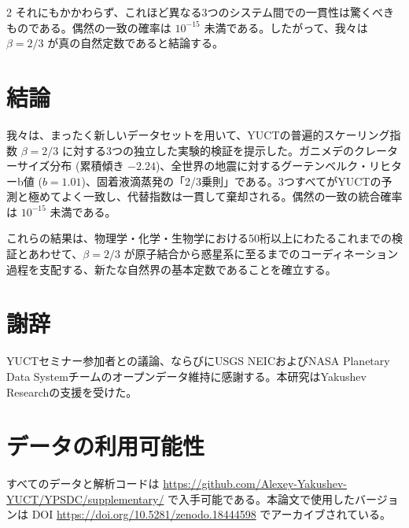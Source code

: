 \documentclass[11pt,a4paper]{article}
\newcommand{\betaf}{\beta}
\begin{document}
\begin{multicols}{2}
		それにもかかわらず、これほど異なる3つのシステム間での一貫性は驚くべきものである。偶然の一致の確率は \(10^{-15}\) 未満である。したがって、我々は \(\betaf = 2/3\) が真の自然定数であると結論する。
		
		\section{結論}
		
		我々は、まったく新しいデータセットを用いて、YUCTの普遍的スケーリング指数 \(\betaf = 2/3\) に対する3つの独立した実験的検証を提示した。ガニメデのクレーターサイズ分布 (累積傾き \(-2.24\))、全世界の地震に対するグーテンベルク・リヒターb値 (\(b = 1.01\))、固着液滴蒸発の「2/3乗則」である。3つすべてがYUCTの予測と極めてよく一致し、代替指数は一貫して棄却される。偶然の一致の統合確率は \(10^{-15}\) 未満である。
		
		これらの結果は、物理学・化学・生物学における50桁以上にわたるこれまでの検証とあわせて、\(\betaf = 2/3\) が原子結合から惑星系に至るまでのコーディネーション過程を支配する、新たな自然界の基本定数であることを確立する。
		
		\section*{謝辞}
		
		YUCTセミナー参加者との議論、ならびにUSGS NEICおよびNASA Planetary Data Systemチームのオープンデータ維持に感謝する。本研究はYakushev Researchの支援を受けた。
		
		\section*{データの利用可能性}
		
		すべてのデータと解析コードは \url{https://github.com/Alexey-Yakushev-YUCT/YPSDC/supplementary/} で入手可能である。本論文で使用したバージョンは DOI \url{https://doi.org/10.5281/zenodo.18444598} でアーカイブされている。
		

\end{multicols}
\end{document}
